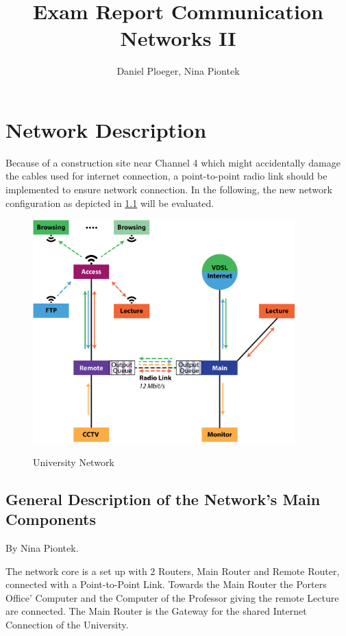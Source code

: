 \documentclass[a4paper,10pt]{book}\usepackage{graphicx}
\title{Exam Report Communication Networks II}
\author{Daniel Ploeger, Nina Piontek}
\begin{document}
\maketitle
\tableofcontents



\chapter{Network Description}
Because of a construction site near Channel 4 which might accidentally damage the cables 
used for internet connection,
a point-to-point radio link should be implemented to ensure network connection.
In the following, the new network configuration as depicted in \ref{fig:network} will be evaluated.
\begin{figure}[!ht]
  \centering
    \includegraphics[width=0.9\textwidth]{graphics-03.eps}
    \label{fig:network}
    \caption{University Network}
\end{figure}

\section{General Description of the Network's Main Components}
By Nina Piontek.

The network core is a set up with 2 Routers, Main Router and Remote Router, connected with a Point-to-Point Link. 
Towards the Main Router the Porters Office' Computer and the Computer of the Professor giving the remote Lecture are connected.
The Main Router is the Gateway for the shared Internet Connection of the University.
\end{document}
